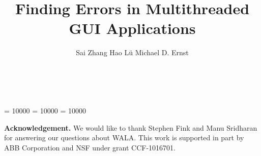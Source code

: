 \documentclass{sig-alternate-issta}
\begin{document}
\clubpenalty = 10000
\widowpenalty = 10000
\displaywidowpenalty = 10000


\title{Finding Errors in Multithreaded GUI Applications}

\author{
\alignauthor Sai Zhang \quad Hao L\"u \quad Michael D. Ernst\\
       \\
       \\
}


\maketitle
\thispagestyle{empty}
\pagestyle{empty}
















\vspace{2mm}

\noindent \textbf{Acknowledgement.} We would like
to thank Stephen Fink and Manu Sridharan for
answering our questions about WALA\@. This work is supported in part by ABB Corporation and NSF under grant CCF-1016701.
\vspace{-2mm}

\balance



\end{document}
